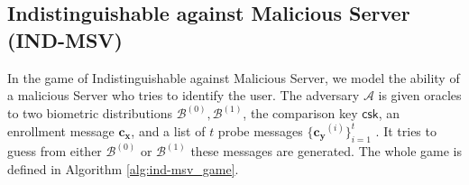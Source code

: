 
\subsection{Indistinguishable against Malicious Server (IND-MSV)}
\label{sec:ind-msv_game}

In the game of Indistinguishable against Malicious Server, we model the ability of a malicious \textsf{Server} who tries to identify the user. The adversary $\mathcal{A}$ is given oracles to two biometric distributions $\mathcal{B}^{(0)}, \mathcal{B}^{(1)}$, the comparison key $\textsf{csk}$, an enrollment message $\mathbf{c_x}$, and a list of $t$ probe messages $\{ \mathbf{c_y}^{(i)} \}_{i=1}^t$ . It tries to guess from either $\mathcal{B}^{(0)}$ or $ \mathcal{B}^{(1)}$ these messages are generated. The whole game is defined in Algorithm \ref{alg:ind-msv_game}.


